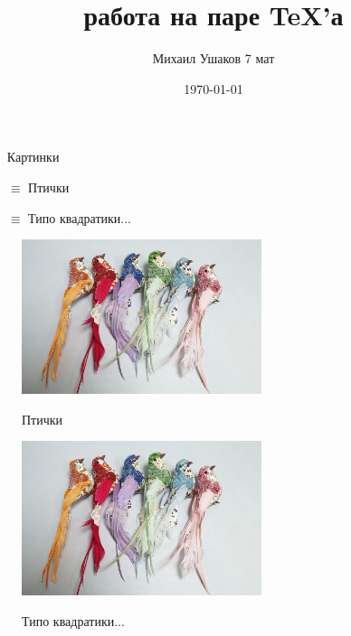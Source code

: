 \documentclass{article}
\title{\bfseries работа на паре \TeX'а}
\author{Михаил Ушаков 7 мат}
\date{\today}
\begin{document}
\maketitle

\begin{itemize}
    \item[] \!\!\!\!\!\!\!\!Картинки
    \item[$\equiv$] Птички
    \item[$\equiv$] Типо квадратики...
\end{itemize}
    
\begin{figure}[t]
\begin{multicols}{2}
\hfill
\includegraphics[width=7cm]{picture.jpg}
\hfill
\caption{Птички}
\label{figLeft}
\hfill
\includegraphics[width=7cm]{picture.jpg}
\hfill
\caption{Типо квадратики...}
\label{figRight}
\end{multicols}
\end{figure}
\end{document}
